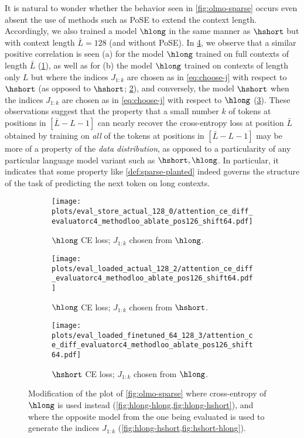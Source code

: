 It is natural to wonder whether the behavior seen in \cref{fig:olmo-sparse} occurs even absent the use of methods such as PoSE to extend the context length. Accordingly, we also trained a model $\hlong$ in the same manner as $\hshort$ but with context length $\bar L = 128$ (and without PoSE). 
In \cref{fig:olmo-sparse-appendix}, we observe that a similar positive correlation is seen (a) for the model $\hlong$ trained on full contexts of length $\bar L$ (\cref{fig:hlong-hlong}), as well as for (b) the model $\hlong$ trained on contexts of length only $L$ but where the indices $J_{1:k}$ are chosen as in \cref{eq:choose-j} with respect to $\hshort$ (as opposed to $\hshort$; \cref{fig:hlong-hshort}), and conversely, the model $\hshort$ when the indices $J_{1:k}$ are chosen as in \cref{eq:choose-j} with respect to $\hlong$ (\cref{fig:hshort-hlong}). These observations suggest that the property that a small number $k$ of tokens at positions in $[\bar L - L - 1]$ can nearly recover the cross-entropy loss at position $\bar L$ obtained by training on \emph{all} of the tokens at positions in $[\bar L - L - 1]$ may be more of a property of the \emph{data distribution}, as opposed to a particularity of any particular language model variant such as $\hshort, \hlong$. In particular, it indicates that some property like \cref{def:sparse-planted} indeed governs the structure of the task of predicting the next token on long contexts.

  \begin{figure*}[t]
    \centering
    \begin{subfigure}[b]{0.3\textwidth}
      \centering
      \texttt{[image: plots/eval\_store\_actual\_128\_0/attention\_ce\_diff\_evaluatorc4\_methodloo\_ablate\_pos126\_shift64.pdf]}
      \caption{{$\hlong$ CE loss; $J_{1:k}$ chosen from $\hlong$.}}
      \label{fig:hlong-hlong}
      \end{subfigure}
      \begin{subfigure}[b]{0.3\textwidth}
        \centering
        \texttt{[image: plots/eval\_loaded\_actual\_128\_2/attention\_ce\_diff\_evaluatorc4\_methodloo\_ablate\_pos126\_shift64.pdf]}
        \caption{{$\hlong$ CE loss;  $J_{1:k}$ chosen from $\hshort$.}}
        \label{fig:hlong-hshort}
        \end{subfigure}
        \begin{subfigure}[b]{0.3\textwidth}
          \centering
          \texttt{[image: plots/eval\_loaded\_finetuned\_64\_128\_3/attention\_ce\_diff\_evaluatorc4\_methodloo\_ablate\_pos126\_shift64.pdf]}
          \caption{ $\hshort$ CE loss; $J_{1:k}$ chosen from $\hlong$.}
          \label{fig:hshort-hlong}
        \end{subfigure}
        
        \caption{Modification of the plot of \cref{fig:olmo-sparse} where cross-entropy of $\hlong$ is used instead (\cref{fig:hlong-hlong,fig:hlong-hshort}), and where the opposite model from the one being evaluated is used to generate the indices $J_{1:k}$ (\cref{fig:hlong-hshort,fig:hshort-hlong}).}
    \label{fig:olmo-sparse-appendix}
  \end{figure*}


